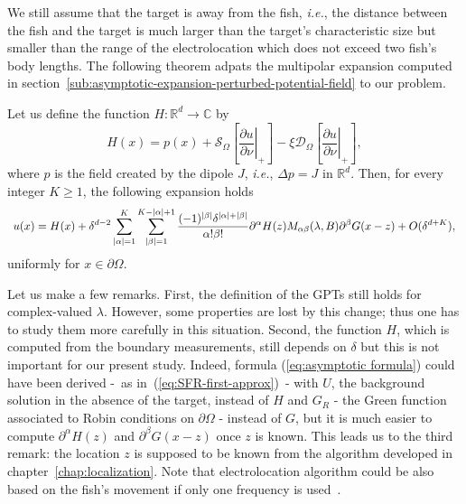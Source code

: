 We still assume that the target is away
from the fish, {\it i.e.}, the distance between the fish and the
target is much larger than the target's characteristic size but
smaller than the range of the electrolocation which does not
exceed two fish's body lengths. The following theorem adpats the multipolar
expansion computed in section~\ref{sub:asymptotic-expansion-perturbed-potential-field} to our problem.
\begin{theorem}
\label{thm:asymptotic-formula}Let us define the function $H:\mathbb{R}^{d}\rightarrow\mathbb{C}$
by
\begin{equation}
H(x)=p(x)+\mathcal{S}_{\Omega}\left[\left.\frac{\partial
u}{\partial\nu}\right|_{+}\right]-\xi\mathcal{D}_{\Omega}\left[\left.\frac{\partial
u}{\partial\nu}\right|_{+}\right],\label{eq:H-def}
\end{equation}
where $p$ is the field created by the dipole $J$, {\it i.e.},
$\Delta p=J$ in $\mathbb{R}^{d}$. Then, for every integer
$K\geq1$, the following expansion holds
\begin{equation} \begin{array}{l}
\displaystyle
u(x)=H(x)+\delta^{d-2}\sum_{\left|\alpha\right|=1}^{K}\sum_{\left|\beta\right|=1}^{K-\left|\alpha\right|+1}
\frac{(-1)^{\vert\beta\vert}\delta^{\left|\alpha\right|+\left|\beta\right|}}{\alpha!\beta!}
\partial^{\alpha}H(z) 
M_{\alpha\beta}(\lambda,B)\partial^{\beta}G(x-z)+O(\delta^{d+K}),
\end{array}\label{eq:asymptotic formula}
\end{equation}
uniformly for $x \in \partial \Omega$.
\end{theorem}
Let us make a few remarks. First, the definition of the GPTs still
holds for complex-valued $\lambda$. However, some properties are
lost by this change; thus one has to study them more carefully in
this situation. Second, the function $H$, which is computed from
the boundary measurements,  still depends on $\delta$ but this is
not important for our present study. Indeed, formula
(\ref{eq:asymptotic formula}) could have been derived -~as in~(\ref{eq:SFR-first-approx})~- with $U$,
the background solution in the absence of the target, instead of
$H$ and $G_{R}$ - the Green function associated to Robin
conditions on $\partial\Omega$ - instead of $G$, but it is much
easier to compute $\partial^{\alpha}H(z)$ and
$\partial^{\beta}G(x-z)$ once $z$ is known. This leads us to the
third remark: the location $z$ is supposed to be known from the
algorithm developed in chapter~\ref{chap:localization}. Note that electrolocation
algorithm could be also based on the fish's movement if
only one frequency is used~\cite{boyer3}.

